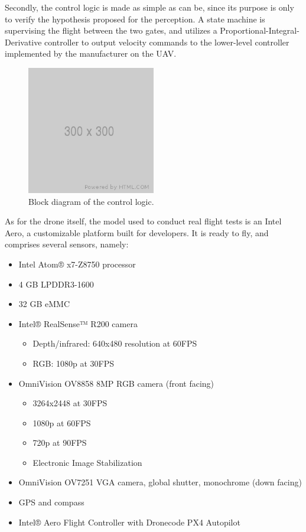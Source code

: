 Secondly, the control logic is made as simple as can be, since its purpose is
only to verify the hypothesis proposed for the perception. A state machine is
supervising the flight between the two gates, and utilizes a
Proportional-Integral-Derivative controller to output velocity commands to the
lower-level controller implemented by the manufacturer on the UAV.\\

\begin{figure}[h]
	\centering
	\includegraphics[width=0.5\textwidth]{figure/300x300.png}
	\caption{Block diagram of the control logic.}
	\label{fig:control-block}
\end{figure}

As for the drone itself, the model used to conduct real flight tests is an Intel
Aero, a customizable platform built for developers. It is ready to fly, and
comprises several sensors, namely:

\begin{itemize}
	\item{Intel Atom® x7-Z8750 processor}
	\item{4 GB LPDDR3-1600}
	\item{32 GB eMMC}
	\item{Intel® RealSense™ R200 camera}
		\begin{itemize}
			\item{Depth/infrared: 640x480 resolution at 60FPS}
			\item{RGB: 1080p at 30FPS}
		\end{itemize}
	\item{OmniVision OV8858 8MP RGB camera (front facing)}
		\begin{itemize}
			\item{3264x2448 at 30FPS}
			\item{1080p at 60FPS}
			\item{720p at 90FPS}
			\item{Electronic Image Stabilization}
		\end{itemize}
	\item{OmniVision OV7251 VGA camera, global shutter, monochrome (down facing)}
	\item{GPS and compass}
	\item{Intel® Aero Flight Controller with Dronecode PX4 Autopilot}
\end{itemize}

